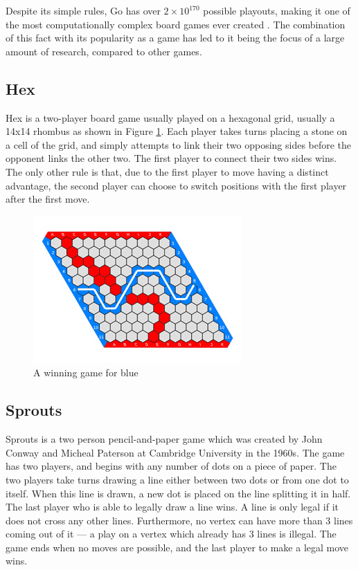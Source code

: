 Despite its simple rules, Go has over $2 \times 10^{170}$ possible playouts, making it one of the most computationally complex board games ever created \cite{Trompfinal}.  The combination of this fact with its popularity as a game has led to it being the focus of a large amount of research, compared to other games.

\subsection{Hex}
Hex is a two-player board game usually played on a hexagonal grid, usually a 14x14 rhombus as shown in Figure \ref{ref:hex}.  Each player takes turns placing a stone on a cell of the grid, and simply attempts to link their two opposing sides before the opponent links the other two.  The first player to connect their two sides wins.  The only other rule is that, due to the first player to move having a distinct advantage, the second player can choose to switch positions with the first player after the first move.

\begin{figure}[h]
\centering
\includegraphics[scale=0.4]{images/hex.jpg}
\caption{A winning game for blue \cite{hexwiki}}
\label{ref:hex}
\end{figure}

\subsection{Sprouts}
Sprouts is a two person pencil-and-paper game which was created by John Conway and Micheal Paterson at Cambridge University in the 1960s. The game has two players, and begins with any number of dots on a piece of paper. The two players take turns drawing a line either between two dots or from one dot to itself. When this line is drawn, a new dot is placed on the line splitting it in half. The last player who is able to legally draw a line wins. A line is only legal if it does not cross any other lines. Furthermore, no vertex can have more than 3 lines coming out of it --- a play on a vertex which already has 3 lines is illegal. The game ends when no moves are possible, and the last player to make a legal move wins.

